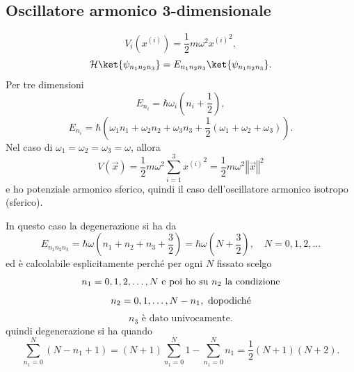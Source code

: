 \subsection{Oscillatore armonico 3-dimensionale}
\[
V_i(x^{(i)}) = \frac{1}{2} m\omega^2{x^{(i)}}^2,
\]
\[
\mathcal{H} \ket{\psi_{n_1 n_2 n_3}} = E_{n_1 n_2 n_3} \ket{\psi_{n_1 n_2 n_3}}.
\]
Per tre dimensioni
\[
E_{n_i} = \hbar \omega_i \left( n_i + \frac{1}{2} \right),
\]
\[
E_{n_i} = \hbar \left( \omega_1 n_1 + \omega_2 n_2 + \omega_3 n_3 + \frac{1}{2} (\omega_1 + \omega_2 + \omega_3) \right).
\]
Nel caso di \( \omega_1 = \omega_2 = \omega_3 = \omega \), allora
\[
V(\vec{x}) = \frac{1}{2} m\omega^2 \sum_{i = 1}^3 {x^{(i)}}^2 = \frac{1}{2} m\omega^2 \left\Vert \vec{x} \right\Vert^2
\]
e ho potenziale armonico sferico, quindi il caso dell'oscillatore armonico isotropo (sferico).

In questo caso la degenerazione si ha da 
\[
E_{n_1 n_2 n_3} = \hbar \omega \left( n_ 1 + n_2 + n_3 + \frac{3}{2} \right) = \hbar \omega \left( N + \frac{3}{2} \right), \quad N = 0, 1, 2, \dots
\]
ed è calcolabile esplicitamente perché per ogni \( N \) fissato scelgo
\[
n_1 = 0, 1, 2, \dots, N \text{ e poi ho su } n_2 \text{ la condizione} \\
\]
\[
n_2 = 0, 1, \dots, N - n_1, \text{ dopodiché} \\
\]
\[
n_3 \text{ è dato univocamente.}
\]
quindi degenerazione si ha quando
\[
\sum_{n_1 = 0}^N (N - n_1 + 1) = (N + 1) \sum_{n_1 = 0}^N 1 - \sum_{n_1 = 0}^N n_1 = \frac{1}{2} (N + 1)(N + 2).
\]